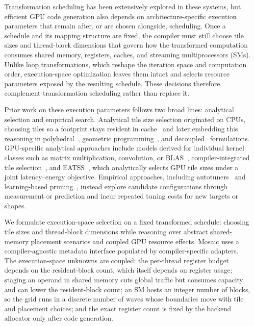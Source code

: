 \documentclass[acmsmall,review,anonymous,screen]{acmart}
\newcommand{\name}{{Mosaic}\xspace}
\newcommand{\gpu}{GPU\xspace}
\begin{document}
Transformation scheduling has been extensively explored in these systems, but efficient \gpu code generation also depends on architecture-specific execution parameters that remain after, or are chosen alongside, scheduling. Once a schedule and its mapping structure are fixed, the compiler must still choose tile sizes and thread-block dimensions that govern how the transformed computation consumes shared memory, registers, caches, and streaming multiprocessors (SMs). Unlike loop transformations, which reshape the iteration space and computation order, execution-space optimization leaves them intact and selects resource parameters exposed by the resulting schedule. These decisions therefore complement transformation scheduling rather than replace it.

Prior work on these execution parameters follows two broad lines: analytical selection and empirical search. Analytical tile size selection originated on CPUs, choosing tiles so a footprint stays resident in cache~\cite{mckinley-tss,lam-tss} and later embedding this reasoning in polyhedral~\cite{pluto-tss}, geometric programming~\cite{rajopadhye-gp,rajopadhye-igp}, and decoupled~\cite{tilemind} formulations. \gpu-specific analytical approaches include models derived for individual kernel classes such as matrix multiplication, convolution, or BLAS~\cite{li-gemm,saday-conv,blis}, compiler-integrated tile selection~\cite{ppcg-tss}, and EATSS~\cite{eatss}, which analytically selects \gpu tile sizes under a joint latency--energy objective. Empirical approaches, including autotuners~\cite{metaschedule,ansor,automatichalide} and learning-based pruning~\cite{hctuner,shirako-tss,yuki-tss}, instead explore candidate configurations through measurement or prediction and incur repeated tuning costs for new targets or shapes.

We formulate execution-space selection on a fixed transformed schedule: choosing tile sizes and thread-block dimensions while reasoning over abstract shared-memory placement scenarios and coupled \gpu resource effects. \name uses a compiler-agnostic metadata interface populated by compiler-specific adapters. The execution-space unknowns are coupled: the per-thread register budget depends on the resident-block count, which itself depends on register usage; staging an operand in shared memory cuts global traffic but consumes capacity and can lower the resident-block count; an SM hosts an integer number of blocks, so the grid runs in a discrete number of waves whose boundaries move with tile and placement choices; and the exact register count is fixed by the backend allocator only after code generation.
\end{document}
